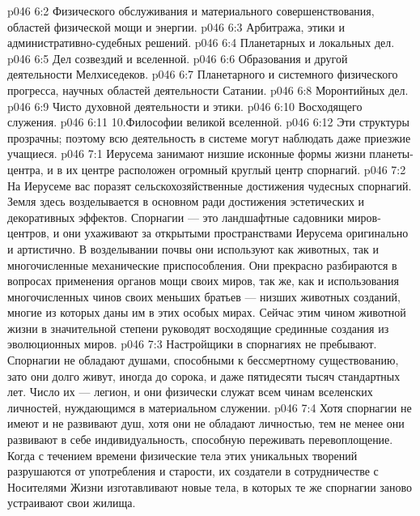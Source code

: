 \vs p046 6:2 \bibnobreakspace Физического обслуживания и материального совершенствования, областей физической мощи и энергии.
\vs p046 6:3 \bibnobreakspace Арбитража, этики и административно\hyp{}судебных решений.
\vs p046 6:4 \bibnobreakspace Планетарных и локальных дел.
\vs p046 6:5 \bibnobreakspace Дел созвездий и вселенной.
\vs p046 6:6 \bibnobreakspace Образования и другой деятельности Мелхиседеков.
\vs p046 6:7 \bibnobreakspace Планетарного и системного физического прогресса, научных областей деятельности Сатании.
\vs p046 6:8 \bibnobreakspace Моронтийных дел.
\vs p046 6:9 \bibnobreakspace Чисто духовной деятельности и этики.
\vs p046 6:10 \bibnobreakspace Восходящего служения.
\vs p046 6:11 10.Философии великой вселенной.
\vs p046 6:12 \pc Эти структуры прозрачны; поэтому всю деятельность в системе могут наблюдать даже приезжие учащиеся.
\vs p046 7:1  Иерусема занимают низшие исконные формы жизни планеты\hyp{}центра, и в их центре расположен огромный круглый центр спорнагий.
\vs p046 7:2 На Иерусеме вас поразят сельскохозяйственные достижения чудесных спорнагий. Земля здесь возделывается в основном ради достижения эстетических и декоративных эффектов. Спорнагии --- это ландшафтные садовники миров\hyp{}центров, и они ухаживают за открытыми пространствами Иерусема оригинально и артистично. В возделывании почвы они используют как животных, так и многочисленные механические приспособления. Они прекрасно разбираются в вопросах применения органов мощи своих миров, так же, как и использования многочисленных чинов своих меньших братьев --- низших животных созданий, многие из которых даны им в этих особых мирах. Сейчас этим чином животной жизни в значительной степени руководят восходящие срединные создания из эволюционных миров.
\vs p046 7:3 Настройщики в спорнагиях не пребывают. Спорнагии не обладают душами, способными к бессмертному существованию, зато они долго живут, иногда до сорока, и даже пятидесяти тысяч стандартных лет. Число их --- легион, и они физически служат всем чинам вселенских личностей, нуждающимся в материальном служении.
\vs p046 7:4 \pc Хотя спорнагии не имеют и не развивают душ, хотя они не обладают личностью, тем не менее они развивают в себе индивидуальность, способную переживать перевоплощение. Когда с течением времени физические тела этих уникальных творений разрушаются от употребления и старости, их создатели в сотрудничестве с Носителями Жизни изготавливают новые тела, в которых те же спорнагии заново устраивают свои жилища.
